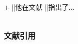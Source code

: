 \begin{shadedsection}
\begin{frame}[fragile]
\begin{columns}
\begin{column}{0.5\textwidth}
\begin{codeblock}[]{ + }
  |\phantom{}|他在文献 \parencite{devoftech}
  |\phantom{}|指出了...\cite{devoftech}
  \printbibliography

      \end{codeblock}
    \end{column}
  \end{columns}
\end{frame}

\begin{frame}
  \frametitle{文献引用}
  \begin{columns}
    \begin{column}{0.5\textwidth}
    \end{column}
    \begin{column}{0.5\textwidth}
    \end{column}
  \end{columns}
\end{frame}

\end{shadedsection}
